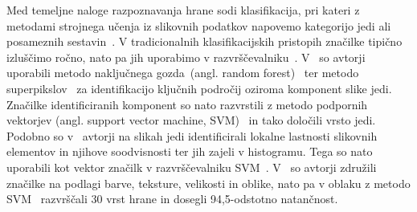\documentclass[a4paper,twoside,openright,12pt,slovene]{book}
\begin{document}
            Med temeljne naloge razpoznavanja hrane sodi klasifikacija, pri
            kateri z metodami strojnega učenja iz slikovnih podatkov napovemo
            kategorijo jedi ali posameznih sestavin~\cite{src:min2019survey}.
            V tradicionalnih klasifikacijskih pristopih značilke tipično
            izluščimo ročno, nato pa jih uporabimo v
            razvrščevalniku~\cite{src:min2019survey}.
            V~\cite{src:bossard2014food} so avtorji uporabili metodo
            naključnega gozda~(angl. random
            forest)~\cite{src:breiman2001randomforest} ter metodo
            superpikslov~\cite{src:ren2003superpixels} za identifikacijo
            ključnih področij oziroma komponent slike jedi. Značilke
            identificiranih komponent so nato razvrstili z metodo podpornih
            vektorjev (angl. support vector machine,
            SVM)~\cite{src:cortes1995svm} in tako določili vrsto jedi. Podobno
            so v~\cite{src:yang2010food} avtorji na slikah jedi identificirali
            lokalne lastnosti slikovnih elementov in njihove soodvisnosti ter
            jih zajeli v histogramu. Tega so nato uporabili kot vektor značilk
            v razvrščevalniku SVM~\cite{src:cortes1995svm}.
            V~\cite{src:pouladzadeh2015cloud} so avtorji združili značilke na
            podlagi barve, teksture, velikosti in oblike, nato pa v oblaku z
            metodo SVM~\cite{src:cortes1995svm} razvrščali 30 vrst hrane in
            dosegli 94,5-odstotno natančnost. 
\end{document}

